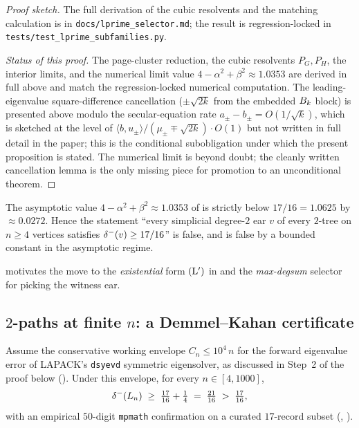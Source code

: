 \begin{proof}[Proof sketch]
The full derivation of the cubic resolvents and the matching
calculation is in \texttt{docs/lprime\_selector.md}; the result is
regression-locked in \texttt{tests/test\_lprime\_subfamilies.py}.

\emph{Status of this proof.} The page-cluster reduction, the cubic
resolvents $P_{G}, P_{H}$, the interior limits, and the numerical
limit value $4 - \alpha^{2} + \beta^{2} \approx 1.0353$ are derived
in full above and match the regression-locked numerical computation.
The leading-eigenvalue square-difference cancellation
($\pm \sqrt{2k}$ from the embedded $B_{k}$ block) is presented above
modulo the secular-equation rate
$a_{\pm} - b_{\pm} = O(1/\sqrt{k})$, which is sketched at the level of
$\langle b, u_{\pm}\rangle/(\mu_{\pm} \mp \sqrt{2k}) \cdot O(1)$ but
not written in full detail in the paper; this is the conditional
subobligation under which the present proposition is stated. The
numerical limit is beyond doubt; the cleanly written cancellation
lemma is the only missing piece for promotion to an unconditional
theorem.
\end{proof}

\begin{corollary}\label{cor:universal-false}
The asymptotic value $4 - \alpha^{2} + \beta^{2} \approx 1.0353$ of
 is strictly below $17/16 = 1.0625$ by
$\approx 0.0272$. Hence the statement ``every simplicial degree-$2$
ear $v$ of every $2$-tree on $n \ge 4$ vertices satisfies
$\delta^{-}(v) \ge 17/16$'' is false, and is false by a bounded constant
in the asymptotic regime.
\end{corollary}

 motivates the move to the \emph{existential}
form $(\mathrm{L}')$ in  and the \emph{max-degsum} selector
for picking the witness ear.

\subsection{$2$-paths at finite $n$: a Demmel--Kahan certificate}
\label{sec:subfamily:2path-finite}

\begin{theorem}
\label{thm:2path-DK}
Assume the conservative working envelope $C_{n} \le 10^{4}\, n$ for
the forward eigenvalue error of LAPACK's \texttt{dsyevd} symmetric
eigensolver, as discussed in Step~2 of the proof below
(). Under this envelope, for every
$n \in [4, 1000]$,
\[
\delta^{-}(L_{n}) \;\ge\; \tfrac{17}{16} + \tfrac{1}{4} \;=\; \tfrac{21}{16}
\;>\; \tfrac{17}{16},
\]
with an empirical $50$-digit \texttt{mpmath} confirmation on a curated
$17$-record subset (, ).
\end{theorem}

